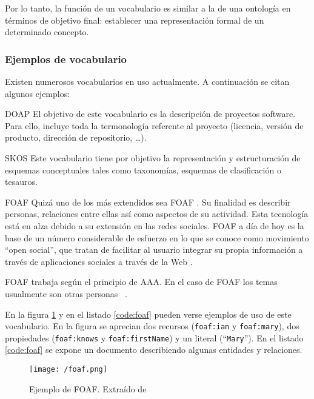 Por lo tanto, la función de un vocabulario es similar a la de una ontología en
términos de objetivo final: establecer una representación formal de un
determinado concepto. 

\subsubsection{Ejemplos de vocabulario}

Existen numerosos vocabularios en uso actualmente. A continuación se citan
algunos ejemplos:

\begin{definitionlist}
\item[\acf{DOAP}] 
  El objetivo de este vocabulario es la descripción de proyectos software. Para
  ello, incluye toda la termonología referente al proyecto (licencia, versión de
  producto, dirección de repositorio, \ldots). 
\item[\acf{SKOS}]
 Este vocabulario tiene por objetivo la representación y estructuración de
 esquemas conceptuales tales como taxonomías, esquemas de clasificación o
 tesauros. 

\item[\acf{FOAF}]
  Quizá uno de los más
  extendidos sea \acf{FOAF} \cite{FOAF}. Su finalidad es describir personas,
  relaciones entre ellas así como aspectos de su actividad. Esta tecnología está
  en alza debido a su extensión en las redes sociales. \acs{FOAF} a día de hoy es
  la base de un número considerable de esfuerzo en lo que se conoce como
  movimiento ``open social'', que tratan de facilitar al usuario integrar su
  propia información a través de aplicaciones sociales a través de la Web
  \cite{Allemang:2008:SWW:1386668}. 

  \acs{FOAF} trabaja según el principio de \acf{AAA}. En el caso de \acs{FOAF} los
  temas usualmente son otras personas ~\cite{Allemang:2008:SWW:1386668}. 

  En la figura \ref{fig:foaf} y en el listado \ref{code:foaf} pueden verse ejemplos de uso de este vocabulario. En
  la figura se aprecian dos recursos (\texttt{foaf:ian} y \texttt{foaf:mary}), dos
  propiedades (\texttt{foaf:knows} y \texttt{foaf:firstName}) y un literal
  (``\texttt{Mary}''). En el listado \ref{code:foaf} se expone un documento
  describiendo algunas entidades y relaciones. 

\end{definitionlist}




\begin{figure}[!h]
  \begin{center}
    \texttt{[image: /foaf.png]} 
    \caption{Ejemplo de \acs{FOAF}. Extraído de \cite{JENA}}
    \label{fig:foaf}
  \end{center}
\end{figure}

